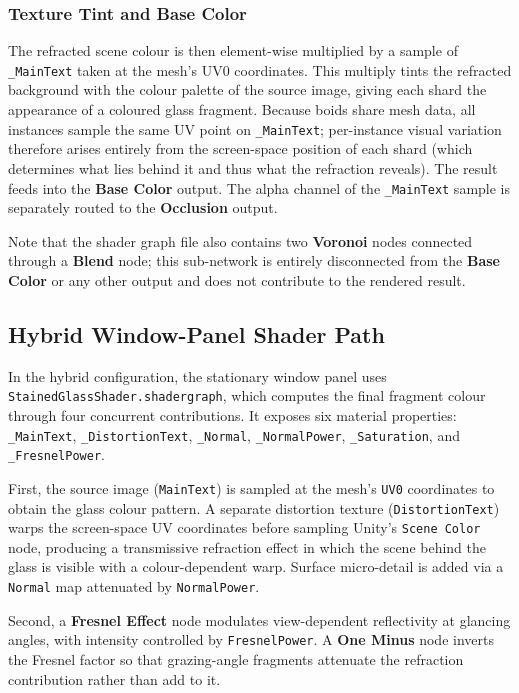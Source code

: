 \documentclass[12pt]{article}
\begin{document}
\subsubsection{Texture Tint and Base Color}

The refracted scene colour is then element-wise multiplied by a sample of \texttt{\_MainText} taken at the mesh's UV0 coordinates. This multiply tints the refracted background with the colour palette of the source image, giving each shard the appearance of a coloured glass fragment. Because boids share mesh data, all instances sample the same UV point on \texttt{\_MainText}; per-instance visual variation therefore arises entirely from the screen-space position of each shard (which determines what lies behind it and thus what the refraction reveals). The result feeds into the \textbf{Base Color} output. The alpha channel of the \texttt{\_MainText} sample is separately routed to the \textbf{Occlusion} output.

Note that the shader graph file also contains two \textbf{Voronoi} nodes connected through a \textbf{Blend} node; this sub-network is entirely disconnected from the \textbf{Base Color} or any other output and does not contribute to the rendered result.


\subsection{Hybrid Window-Panel Shader Path}
\label{subsec:hybrid-window-path}

In the hybrid configuration, the stationary window panel uses \texttt{StainedGlassShader.shadergraph}, which computes the final fragment colour through four concurrent contributions. It exposes six material properties: \texttt{\_MainText}, \texttt{\_DistortionText}, \texttt{\_Normal}, \texttt{\_NormalPower}, \texttt{\_Saturation}, and \texttt{\_FresnelPower}.

First, the source image (\texttt{MainText}) is sampled at the mesh's \texttt{UV0} coordinates to obtain the glass colour pattern. A separate distortion texture (\texttt{DistortionText}) warps the screen-space UV coordinates before sampling Unity's \texttt{Scene Color} node, producing a transmissive refraction effect in which the scene behind the glass is visible with a colour-dependent warp. Surface micro-detail is added via a \texttt{Normal} map attenuated by \texttt{NormalPower}.

Second, a \textbf{Fresnel Effect} node modulates view-dependent reflectivity at glancing angles, with intensity controlled by \texttt{FresnelPower}. A \textbf{One Minus} node inverts the Fresnel factor so that grazing-angle fragments attenuate the refraction contribution rather than add to it.
\end{document}

